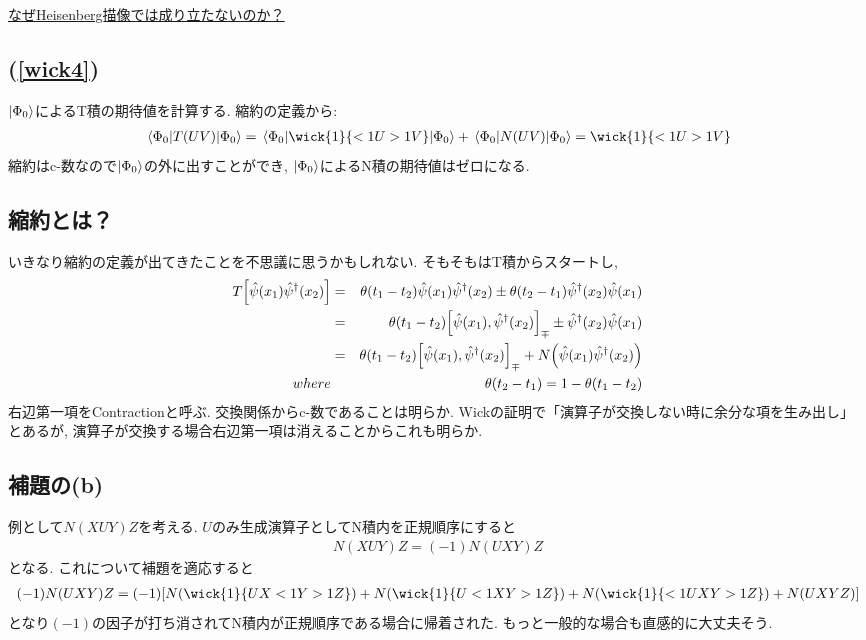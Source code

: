 \documentclass[10.5pt,a4paper]{jreport}
\newcommand{\ul}[1]{\underline{#1}}
\newcommand{\hpsi}{\hat{\psi}}
\begin{document}
\ul{なぜHeisenberg描像では成り立たないのか？}
\subsection{(\ref{wick4})}
$\ket{\Phi_0}$によるT積の期待値を計算する. 縮約の定義から:
\begin{eqnarray}
  \ev{T(UV)}{\Phi_0} = \ev{\wick{1}{<1U >1V}}{\Phi_0} + \ev{N(UV)}{\Phi_0} = \wick{1}{<1U >1V}
\end{eqnarray}
縮約はc-数なので$\ket{\Phi_0}$の外に出すことができ, $\ket{\Phi_0}$によるN積の期待値はゼロになる. 
\subsection{縮約とは？}
いきなり縮約の定義が出てきたことを不思議に思うかもしれない. そもそもはT積からスタートし,
\begin{eqnarray}
  T\qty[\hpsi(x_1)\hpsi^\dagger(x_2)] &=& \theta\qty(t_1 - t_2)\hpsi(x_1)\hpsi^\dagger(x_2) \pm \theta\qty(t_2 - t_1)\hpsi^\dagger(x_2)\hpsi(x_1)\\
  &=& \theta\qty(t_1 - t_2)\qty[\hpsi(x_1), \hpsi^\dagger(x_2)]_{\mp} \pm \hpsi^\dagger(x_2)\hpsi(x_1)\\
  &=& \theta\qty(t_1 - t_2)\qty[\hpsi(x_1), \hpsi^\dagger(x_2)]_{\mp} + N\qty(\hpsi(x_1)\hpsi^\dagger(x_2))\\
  \nonumber  where &&\theta\qty(t_2 - t_1) = 1 - \theta\qty(t_1 - t_2)
\end{eqnarray}
右辺第一項をContractionと呼ぶ. 交換関係からc-数であることは明らか. Wickの証明で「演算子が交換しない時に余分な項を生み出し」とあるが, 演算子が交換する場合右辺第一項は消えることからこれも明らか.

\subsection{補題の(b)}
例として$N(XUY)Z$を考える. $U$のみ生成演算子としてN積内を正規順序にすると
\begin{eqnarray}
  N(XUY)Z = (-1)N(UXY)Z
\end{eqnarray}
となる. これについて補題を適応すると
\begin{eqnarray}
  (-1)N(UXY)Z = (-1)\qty[N(\wick{1}{UX<1Y>1Z}) + N(\wick{1}{U<1XY>1Z})+ N(\wick{1}{<1UXY>1Z})+ N(UXYZ)]
\end{eqnarray}
となり$(-1)$の因子が打ち消されてN積内が正規順序である場合に帰着された. もっと一般的な場合も直感的に大丈夫そう. 
\end{document}
